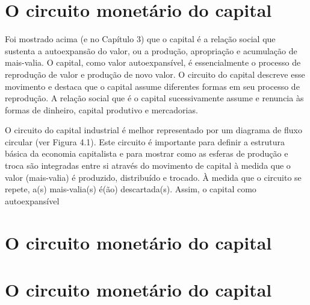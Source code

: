 \section{O circuito monetário do capital}
 \par 
Foi mostrado acima (e no Capítulo {\color{blue}3}) que o capital é a relação social que sustenta a autoexpansão do valor, ou a produção, apropriação e acumulação de mais-valia. O capital, como valor autoexpansível, é essencialmente o processo de reprodução de valor e produção de novo valor. O circuito do capital descreve esse movimento e destaca que o capital assume diferentes formas em seu processo de reprodução. A relação social que é o capital sucessivamente assume e renuncia às formas de dinheiro, capital produtivo e mercadorias.
 \par 
O circuito do capital industrial é melhor representado por um diagrama de fluxo circular (ver Figura {\color{blue}4}.1). Este circuito é importante para definir a estrutura básica da economia capitalista e para mostrar como as esferas de produção e troca são integradas entre si através do movimento de capital à medida que o valor (mais-valia) é produzido, distribuído e trocado. À medida que o circuito se repete, a(s) mais-valia(s) é(ão) descartada(s). Assim, o capital como autoexpansível
 \par 
\section{O circuito monetário do capital}
 \par 
\section{O circuito monetário do capital}
 \par 
